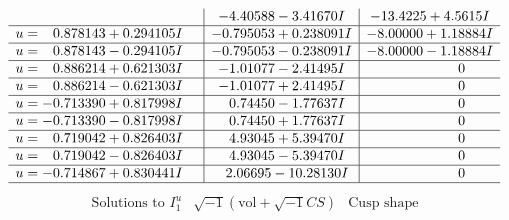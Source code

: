 \documentclass[1p]{elsarticle_modified}
\theoremstyle{definition}
\newcommand{\I}{\sqrt{-1}}
\begin{document}
$$\begin{array}{c|c|c}
 & -4.40588 - 3.41670 I & -13.4225 + 4.5615 I \\ \hline\begin{aligned}
u &= \phantom{-}0.878143 + 0.294105 I\end{aligned}
 & -0.795053 + 0.238091 I & -8.00000 + 1.18884 I \\ \hline\begin{aligned}
u &= \phantom{-}0.878143 - 0.294105 I\end{aligned}
 & -0.795053 - 0.238091 I & -8.00000 - 1.18884 I \\ \hline\begin{aligned}
u &= \phantom{-}0.886214 + 0.621303 I\end{aligned}
 & -1.01077 - 2.41495 I & \phantom{-0.000000 } 0 \\ \hline\begin{aligned}
u &= \phantom{-}0.886214 - 0.621303 I\end{aligned}
 & -1.01077 + 2.41495 I & \phantom{-0.000000 } 0 \\ \hline\begin{aligned}
u &= -0.713390 + 0.817998 I\end{aligned}
 & \phantom{-}0.74450 - 1.77637 I & \phantom{-0.000000 } 0 \\ \hline\begin{aligned}
u &= -0.713390 - 0.817998 I\end{aligned}
 & \phantom{-}0.74450 + 1.77637 I & \phantom{-0.000000 } 0 \\ \hline\begin{aligned}
u &= \phantom{-}0.719042 + 0.826403 I\end{aligned}
 & \phantom{-}4.93045 + 5.39470 I & \phantom{-0.000000 } 0 \\ \hline\begin{aligned}
u &= \phantom{-}0.719042 - 0.826403 I\end{aligned}
 & \phantom{-}4.93045 - 5.39470 I & \phantom{-0.000000 } 0 \\ \hline\begin{aligned}
u &= -0.714867 + 0.830441 I\end{aligned}
 & \phantom{-}2.06695 - 10.28130 I & \phantom{-0.000000 } 0\\
 \hline 
 \end{array}$$\newpage$$\begin{array}{c|c|c}  
\text{Solutions to }I^u_{1}& \I (\text{vol} + \sqrt{-1}CS) & \text{Cusp shape}\\
 \hline 
\begin{aligned}

\end{aligned}
\end{array}$$
\end{document}
